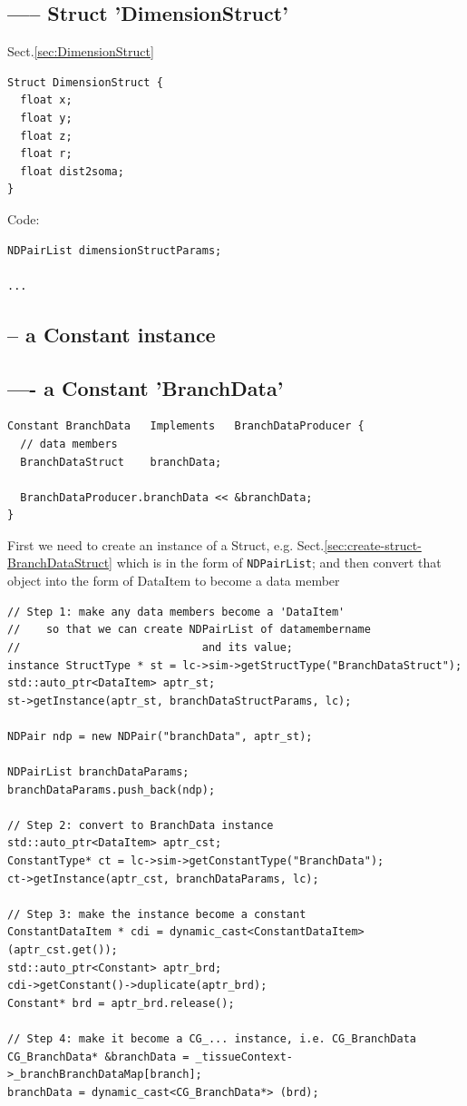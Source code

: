 \subsection{----- Struct 'DimensionStruct'}
\label{sec:create-struct-DimensionStruct}

Sect.\ref{sec:DimensionStruct}
\begin{verbatim}
Struct DimensionStruct {
  float x;
  float y;
  float z;
  float r;
  float dist2soma;
}
\end{verbatim}

Code:
\begin{verbatim}
NDPairList dimensionStructParams;

...
\end{verbatim}


\subsection{-- a Constant instance}
\label{sec:create-constant-C++}


\subsection{---- a Constant 'BranchData'}
\label{sec:create-constant-BranchData}

\begin{verbatim}
Constant BranchData   Implements   BranchDataProducer {
  // data members
  BranchDataStruct    branchData;
  
  BranchDataProducer.branchData << &branchData;
}
\end{verbatim}

First we need to create an instance of a Struct, e.g.
Sect.\ref{sec:create-struct-BranchDataStruct} which is in the form of
\verb!NDPairList!; and then convert that object into the form of DataItem to
become a data member 
\begin{verbatim}
// Step 1: make any data members become a 'DataItem'
//    so that we can create NDPairList of datamembername 
//                            and its value; 
instance StructType * st = lc->sim->getStructType("BranchDataStruct");
std::auto_ptr<DataItem> aptr_st;
st->getInstance(aptr_st, branchDataStructParams, lc);

NDPair ndp = new NDPair("branchData", aptr_st);

NDPairList branchDataParams;
branchDataParams.push_back(ndp);

// Step 2: convert to BranchData instance
std::auto_ptr<DataItem> aptr_cst;
ConstantType* ct = lc->sim->getConstantType("BranchData");
ct->getInstance(aptr_cst, branchDataParams, lc);

// Step 3: make the instance become a constant
ConstantDataItem * cdi = dynamic_cast<ConstantDataItem>(aptr_cst.get());
std::auto_ptr<Constant> aptr_brd;
cdi->getConstant()->duplicate(aptr_brd);
Constant* brd = aptr_brd.release(); 

// Step 4: make it become a CG_... instance, i.e. CG_BranchData
CG_BranchData* &branchData = _tissueContext->_branchBranchDataMap[branch];
branchData = dynamic_cast<CG_BranchData*> (brd);
\end{verbatim}


